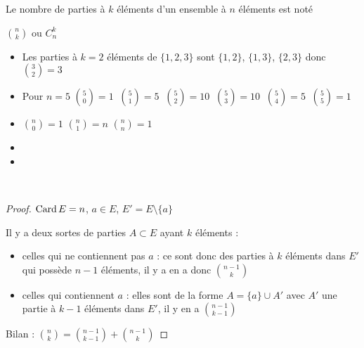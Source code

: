 \begin{frame}

\begin{mydefinition}
Le nombre de parties à $k$ éléments d'un ensemble à $n$ éléments est
noté

\smallskip

\centerline{$\binom{n}{k}$ \quad ou \quad $C_n^k$}
\end{mydefinition}

\pause

{\footnotesize
\begin{exemple}
\begin{itemize}
\item Les parties à $k\!=\!2$ éléments de $\{1,2,3\}$ sont $\{1,2\}$, $\{1,3\}$, $\{2,3\}$
donc $\binom{3}{2} = 3$
\pause
\item Pour $n=5$ \qquad
$
\binom{5}{0} = 1 \;\;
\binom{5}{1} = 5 \;\;
\binom{5}{2} = 10 \;\;
\binom{5}{3} = 10 \;\;
\binom{5}{4} = 5 \;\;
\binom{5}{5} = 1
$
\end{itemize}
\end{exemple}
}
\pause

\begin{proposition}
\begin{itemize}
  \item $\binom{n}{0}=1$ \quad  $\binom{n}{1}=n$ \quad  $\binom{n}{n}=1$
\pause
  \item {}
\pause
  \item {}
\end{itemize}
\end{proposition}

\end{frame}


\begin{frame}


\begin{proposition}\ 
\end{proposition}

\pause

\begin{proof}
$\mathop{\text{Card}}\nolimits E = n$, \quad $a \in E$, \quad  $E' = E \setminus \{ a \}$

\pause

Il y a deux sortes de parties $A \subset E$ ayant $k$ éléments :
\begin{itemize}
\pause
  \item celles qui ne contiennent pas $a$ : 
\pause
ce sont donc des parties à $k$ éléments 
dans $E'$ qui possède $n-1$ éléments, il y a en a donc $\binom{n-1}{k}$
\pause
  \item celles qui contiennent $a$ : 
\pause
elles sont de la forme $A = \{a\} \cup A'$ 
avec $A'$ une partie à $k-1$ éléments dans $E'$, il y en a $\binom{n-1}{k-1}$
\end{itemize}
\pause
Bilan : $\binom n k = \binom{n-1}{k-1} + \binom{n-1}{k}$
\end{proof}
\end{frame}

